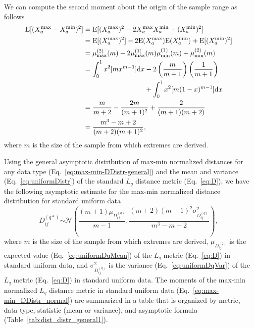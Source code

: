 \documentclass[aoas]{imsart}
\begin{document}
We can compute the second moment about the origin of the sample range as follows
%
\begin{equation}\label{eq:mu2_rng_uniform}
\begin{aligned}
\text{E}[(X^\text{max}_a - X^\text{min}_a)^2] &= \text{E}[(X^\text{max}_a)^2 - 2 X^\text{max}_a X^\text{min}_a + (X^\text{min}_a)^2] \\
&= \text{E}[(X^\text{max}_a)^2] - 2 \text{E}(X^\text{max}_a) \text{E}(X^\text{min}_a) + \text{E}[(X^\text{min}_a)^2] \\
&= \mu^{(2)}_\text{max}(m) - 2 \mu^{(1)}_\text{max}(m) \mu^{(1)}_\text{min}(m) + \mu^{(2)}_\text{min}(m) \\
&= \int_{0}^{1} x^2 [m x^{m-1}] \text{d}x - 2 \left(\frac{m}{m+1}\right) \left(\frac{1}{m+1}\right) \\
& \hspace{3.12cm} + \int_{0}^{1} x^2 [m (1 - x)^{m-1}] \text{d}x \\
&= \frac{m}{m+2} - \frac{2m}{(m+1)^2} + \frac{2}{(m+1)(m+2)} \\
&= \frac{m^3 - m + 2}{(m+2)(m+1)^2},
\end{aligned}
\end{equation}
%
where $m$ is the size of the sample from which extremes are derived.

Using the general asymptotic distribution of max-min normalized distances for any data type (Eq.~\ref{eq:max-min-DDistr-general}) and the mean and variance (Eq.~\ref{eq:uniformDistr}) of the standard $L_q$ distance metric (Eq.~\ref{eq:D}), we have the following asymptotic estimate for the max-min normalized distance distribution for standard uniform data
%
\begin{equation}\label{eq:max-min_DDistr_uniform}
D^{(q*)}_{ij} \overset{.}{\sim} \mathcal{N}\left(\frac{(m+1)\mu_{D^{(q)}_{ij}}}{m-1}, \frac{(m+2)(m+1)^2 \sigma^2_{D^{(q)}_{ij}}}{m^3 - m + 2}\right),
\end{equation}
%
where $m$ is the size of the sample from which extremes are derived, $\mu_{D^{(q)}_{ij}}$ is the expected value (Eq.~\ref{eq:uniformDqMean}) of the $L_q$ metric (Eq.~\ref{eq:D}) in standard uniform data, and $\sigma^2_{D^{(q)}_{ij}}$ is the variance (Eq.~\ref{eq:uniformDqVar}) of the $L_q$ metric (Eq.~\ref{eq:D}) in standard uniform data. The moments of the max-min normalized $L_q$ distance metric in standard uniform data (Eq.~\ref{eq:max-min_DDistr_normal}) are summarized in a table that is organized by metric, data type, statistic (mean or variance), and asymptotic formula (Table~\ref{tab:dist_distr_general1}).
\end{document}
